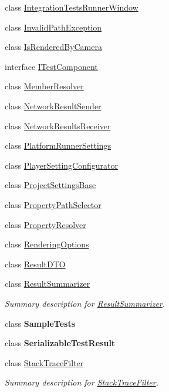 \begin{DoxyCompactItemize}
class \hyperlink{class_unity_test_1_1_integration_tests_runner_window}{Integration\+Tests\+Runner\+Window}
\item 
class \hyperlink{class_unity_test_1_1_invalid_path_exception}{Invalid\+Path\+Exception}
\item 
class \hyperlink{class_unity_test_1_1_is_rendered_by_camera}{Is\+Rendered\+By\+Camera}
\item 
interface \hyperlink{interface_unity_test_1_1_i_test_component}{I\+Test\+Component}
\item 
class \hyperlink{class_unity_test_1_1_member_resolver}{Member\+Resolver}
\item 
class \hyperlink{class_unity_test_1_1_network_result_sender}{Network\+Result\+Sender}
\item 
class \hyperlink{class_unity_test_1_1_network_results_receiver}{Network\+Results\+Receiver}
\item 
class \hyperlink{class_unity_test_1_1_platform_runner_settings}{Platform\+Runner\+Settings}
\item 
class \hyperlink{class_unity_test_1_1_player_setting_configurator}{Player\+Setting\+Configurator}
\item 
class \hyperlink{class_unity_test_1_1_project_settings_base}{Project\+Settings\+Base}
\item 
class \hyperlink{class_unity_test_1_1_property_path_selector}{Property\+Path\+Selector}
\item 
class \hyperlink{class_unity_test_1_1_property_resolver}{Property\+Resolver}
\item 
class \hyperlink{class_unity_test_1_1_rendering_options}{Rendering\+Options}
\item 
class \hyperlink{class_unity_test_1_1_result_d_t_o}{Result\+D\+TO}
\item 
class \hyperlink{class_unity_test_1_1_result_summarizer}{Result\+Summarizer}
\begin{DoxyCompactList}\small\item\em Summary description for \hyperlink{class_unity_test_1_1_result_summarizer}{Result\+Summarizer}. \end{DoxyCompactList}\item 
class {\bfseries Sample\+Tests}
\item 
class {\bfseries Serializable\+Test\+Result}
\item 
class \hyperlink{class_unity_test_1_1_stack_trace_filter}{Stack\+Trace\+Filter}
\begin{DoxyCompactList}\small\item\em Summary description for \hyperlink{class_unity_test_1_1_stack_trace_filter}{Stack\+Trace\+Filter}. \end{DoxyCompactList}\item 

\end{DoxyCompactItemize}
